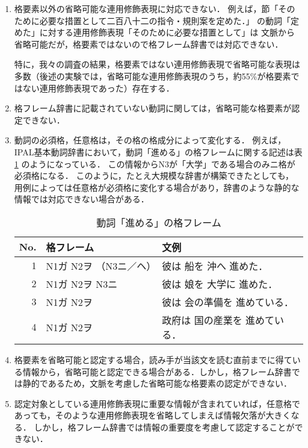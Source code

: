 \begin{enumerate}
\item 格要素以外の省略可能な連用修飾表現に対応できない．
例えば，節「そのために必要な措置として二百八十二の指令・規則案を定めた．」
の動詞「定めた」に対する連用修飾表現「そのために必要な措置として」は
文脈から省略可能だが，格要素ではないので格フレーム辞書では対応できない．

特に，我々の調査の結果，格要素ではない連用修飾表現で省略可能な表現は多数（後述の実験では，省略可能な連用修飾表現のうち，約55\%が格要素ではない連用修飾表現であった）存在する．
\item 格フレーム辞書に記載されていない動詞に関しては，省略可能な格要素が認定できない．
\item 動詞の必須格，任意格は，その格の格成分によって変化する．
例えば，IPAL基本動詞辞書において，動詞「進める」の格フレームに関する記述は表\ref{SUSUMERU} のようになっている．
この情報からN3が「大学」である場合のみニ格が必須格になる．
このように，たとえ大規模な辞書が構築できたとしても，
用例によっては任意格が必須格に変化する場合があり，辞書のような静的な情報では対応できない場合がある．
\begin{table}[bt]
\begin{center}
\caption{動詞「進める」の格フレーム} \label{SUSUMERU}
\begin{tabular}{r|l|l}
\hline
No. & 格フレーム	     & 文例 \\ \hline \hline
1   & N1ガ N2ヲ （N3ニ／ヘ） & 彼は 船を 沖へ 進めた．      \\
2   & N1ガ N2ヲ N3ニ         & 彼は 娘を 大学に 進めた．    \\
3   & N1ガ N2ヲ              & 彼は 会の準備を 進めている．  \\ 
4   & N1ガ N2ヲ              & 政府は 国の産業を 進めている．\\ 
\hline
\end{tabular}
\end{center}
\end{table}
\item 格要素を省略可能と認定する場合，読み手が当該文を読む直前までに得ている情報から，省略可能と認定できる場合がある．しかし，格フレーム辞書では静的であるため，文脈を考慮した省略可能な格要素の認定ができない．
\item 認定対象としている連用修飾表現に重要な情報が含まれていれば，任意格であっても，そのような連用修飾表現を省略してしまえば情報欠落が大きくなる．
しかし，格フレーム辞書では情報の重要度を考慮して認定することができない．
\end{enumerate}

